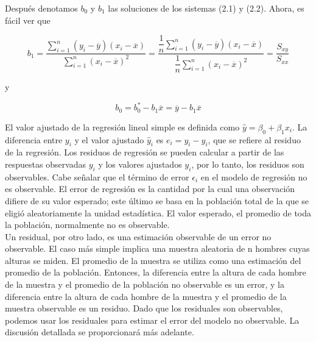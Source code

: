 Después denotamos $b_0$ y $b_1$ las soluciones de los sistemas (2.1) y (2.2). Ahora, es fácil ver que
\begin{tcolorbox}
    \begin{equation}
	b_1=\dfrac{\sum\limits_{i=1}^n (y_i-\overline{y})(x_i-\overline{x})}{\sum\limits_{i=1}^n (x_i-\overline{x})^2}=\dfrac{\dfrac{1}{n}\sum\limits_{i=1}^n (y_i-\overline{y})(x_i-\overline{x})}{\dfrac{1}{n}\sum\limits_{i=1}^n (x_i-\overline{x})^2}=\dfrac{S_{xy}}{S_{xx}}
    \end{equation}
\end{tcolorbox}

y

\begin{tcolorbox}
    \begin{equation}
	b_0=b_0^*-b_1\overline{x}=\overline{y}-b_1\overline{x}
    \end{equation}
\end{tcolorbox}
\vspace{0.5cm}

El valor ajustado de la regresión lineal simple es definida como $\hat{y}=\beta_0+\beta_1x_i.$ La diferencia entre $y_i$ y el valor ajustado $\hat{y}_i$ es $e_i=y_i-\hat{y}_i$, que se refiere al residuo de la regresión. Los residuos de regresión se pueden calcular a partir de las respuestas observadas $y_i$ y los valores ajustados $y_i$, por lo tanto, los residuos son observables. Cabe señalar que el término de error $\epsilon_i$ en el modelo de regresión no es observable. El error de regresión es la cantidad por la cual una observación difiere de su valor esperado; este último se basa en la población total de la que se eligió aleatoriamente la unidad estadística. El valor esperado, el promedio de toda la población, normalmente no es observable.\\

Un residual, por otro lado, es una estimación observable de un error no observable. El caso más simple implica una muestra aleatoria de n hombres cuyas alturas se miden. El promedio de la muestra se utiliza como una estimación del promedio de la población. Entonces, la diferencia entre la altura de cada hombre de la muestra y el promedio de la población no observable es un error, y la diferencia entre la altura de cada hombre de la muestra y el promedio de la muestra observable es un residuo. Dado que los residuales son observables, podemos usar los residuales para estimar el error del modelo no observable. La discusión detallada se proporcionará más adelante.

